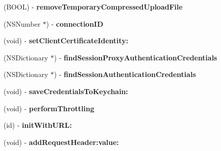 \begin{DoxyCompactItemize}
\item 
\hypertarget{interface_a_s_i_h_t_t_p_request_a4f8b19d66be57ffad0d6128182c98414}{
(\-B\-O\-O\-L) -\/ {\bfseries remove\-Temporary\-Compressed\-Upload\-File}}
\label{interface_a_s_i_h_t_t_p_request_a4f8b19d66be57ffad0d6128182c98414}

\item 
\hypertarget{interface_a_s_i_h_t_t_p_request_a3e06c0a51784d32cc8198f616e63c530}{
(\-N\-S\-Number $\ast$) -\/ {\bfseries connection\-I\-D}}
\label{interface_a_s_i_h_t_t_p_request_a3e06c0a51784d32cc8198f616e63c530}

\item 
\hypertarget{interface_a_s_i_h_t_t_p_request_a4f24e48396e06b8a81de111e19c1314a}{
(void) -\/ {\bfseries set\-Client\-Certificate\-Identity\-:}}
\label{interface_a_s_i_h_t_t_p_request_a4f24e48396e06b8a81de111e19c1314a}

\item 
\hypertarget{interface_a_s_i_h_t_t_p_request_a480d62ba0d9ba8d1a64b25b45fb2d965}{
(\-N\-S\-Dictionary $\ast$) -\/ {\bfseries find\-Session\-Proxy\-Authentication\-Credentials}}
\label{interface_a_s_i_h_t_t_p_request_a480d62ba0d9ba8d1a64b25b45fb2d965}

\item 
\hypertarget{interface_a_s_i_h_t_t_p_request_a0f38ffc0ae199e83262895f640c9c263}{
(\-N\-S\-Dictionary $\ast$) -\/ {\bfseries find\-Session\-Authentication\-Credentials}}
\label{interface_a_s_i_h_t_t_p_request_a0f38ffc0ae199e83262895f640c9c263}

\item 
\hypertarget{interface_a_s_i_h_t_t_p_request_a3a57684f5aba49781ec3c9c9ef1516a6}{
(void) -\/ {\bfseries save\-Credentials\-To\-Keychain\-:}}
\label{interface_a_s_i_h_t_t_p_request_a3a57684f5aba49781ec3c9c9ef1516a6}

\item 
\hypertarget{interface_a_s_i_h_t_t_p_request_a510b47cc1be0b9c1968a9c8cc3859038}{
(void) -\/ {\bfseries perform\-Throttling}}
\label{interface_a_s_i_h_t_t_p_request_a510b47cc1be0b9c1968a9c8cc3859038}

\item 
\hypertarget{interface_a_s_i_h_t_t_p_request_aec75eeba26544a9da35e795011fe4a42}{
(id) -\/ {\bfseries init\-With\-U\-R\-L\-:}}
\label{interface_a_s_i_h_t_t_p_request_aec75eeba26544a9da35e795011fe4a42}

\item 
\hypertarget{interface_a_s_i_h_t_t_p_request_a0e969f091acb07bbbe6dbc9295260d64}{
(void) -\/ {\bfseries add\-Request\-Header\-:value\-:}}
\label{interface_a_s_i_h_t_t_p_request_a0e969f091acb07bbbe6dbc9295260d64}


\end{DoxyCompactItemize}
